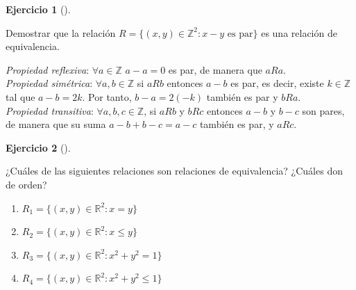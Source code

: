 \documentclass[
  a4paper,
]{scrreport}
\providecommand{\tightlist}{%
  \setlength{\itemsep}{0pt}\setlength{\parskip}{0pt}}\usepackage{longtable,booktabs,array}
\theoremstyle{definition}
\newtheorem{exercise}{Ejercicio}[chapter]
\theoremstyle{remark}
\begin{document}
\begin{exercise}[]\protect\hypertarget{exr-relacion-equivalencia-1}{}\label{exr-relacion-equivalencia-1}

Demostrar que la relación
\(R=\{(x,y)\in \mathbb{Z}^2: x-y \mbox{ es par}\}\) es una relación de
equivalencia.

\end{exercise}

\begin{tcolorbox}[enhanced jigsaw, toprule=.15mm, coltitle=black, colframe=quarto-callout-tip-color-frame, leftrule=.75mm, breakable, left=2mm, opacitybacktitle=0.6, colbacktitle=quarto-callout-tip-color!10!white, bottomrule=.15mm, opacityback=0, title=\textcolor{quarto-callout-tip-color}{\faLightbulb}\hspace{0.5em}{Solución}, bottomtitle=1mm, toptitle=1mm, titlerule=0mm, colback=white, arc=.35mm, rightrule=.15mm]

\emph{Propiedad reflexiva}: \(\forall a\in\mathbb{Z}\) \(a-a=0\) es par,
de manera que \(aRa\).\\
\emph{Propiedad simétrica}: \(\forall a,b\in\mathbb{Z}\) si \(aRb\)
entonces \(a-b\) es par, es decir, existe \(k\in \mathbb{Z}\) tal que
\(a-b=2k\). Por tanto, \(b-a=2(-k)\) también es par y \(bRa\).\\
\emph{Propiedad transitiva}: \(\forall a,b,c\in\mathbb{Z}\), si \(aRb\)
y \(bRc\) entonces \(a-b\) y \(b-c\) son pares, de manera que su suma
\(a-b+b-c = a-c\) también es par, y \(aRc\).

\end{tcolorbox}

\begin{exercise}[]\protect\hypertarget{exr-relaciones-equivalencia}{}\label{exr-relaciones-equivalencia}

¿Cuáles de las siguientes relaciones son relaciones de equivalencia?
¿Cuáles don de orden?

\begin{enumerate}
\def\labelenumi{\alph{enumi}.}
\tightlist
\item
  \(R_1=\{(x,y)\in \mathbb{R}^2: x = y\}\)
\item
  \(R_2=\{(x,y)\in \mathbb{R}^2: x\leq y\}\)
\item
  \(R_3=\{(x,y)\in \mathbb{R}^2: x^2 + y^2 = 1\}\)
\item
  \(R_4=\{(x,y)\in \mathbb{R}^2: x^2 + y^2 \leq 1\}\)
\end{enumerate}

\end{exercise}
\end{document}
